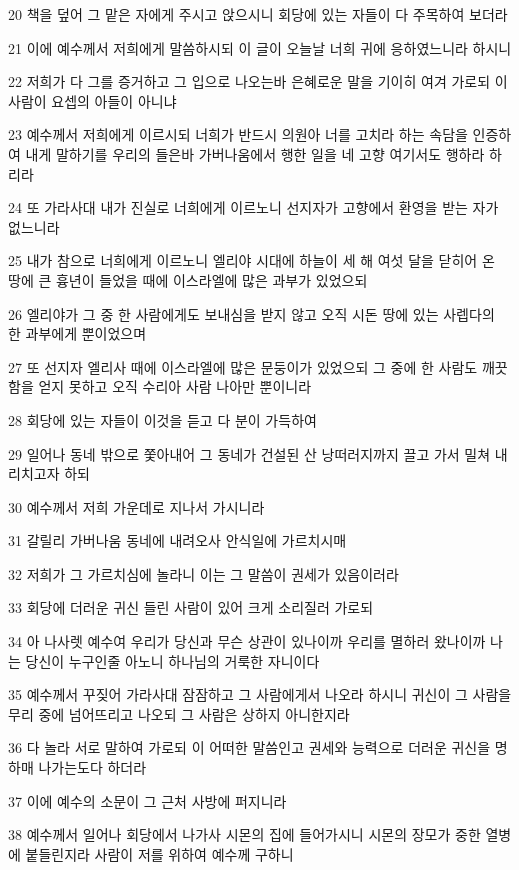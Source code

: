 \par 20 책을 덮어 그 맡은 자에게 주시고 앉으시니 회당에 있는 자들이 다 주목하여 보더라
\par 21 이에 예수께서 저희에게 말씀하시되 이 글이 오늘날 너희 귀에 응하였느니라 하시니
\par 22 저희가 다 그를 증거하고 그 입으로 나오는바 은혜로운 말을 기이히 여겨 가로되 이 사람이 요셉의 아들이 아니냐
\par 23 예수께서 저희에게 이르시되 너희가 반드시 의원아 너를 고치라 하는 속담을 인증하여 내게 말하기를 우리의 들은바 가버나움에서 행한 일을 네 고향 여기서도 행하라 하리라
\par 24 또 가라사대 내가 진실로 너희에게 이르노니 선지자가 고향에서 환영을 받는 자가 없느니라
\par 25 내가 참으로 너희에게 이르노니 엘리야 시대에 하늘이 세 해 여섯 달을 닫히어 온 땅에 큰 흉년이 들었을 때에 이스라엘에 많은 과부가 있었으되
\par 26 엘리야가 그 중 한 사람에게도 보내심을 받지 않고 오직 시돈 땅에 있는 사렙다의 한 과부에게 뿐이었으며
\par 27 또 선지자 엘리사 때에 이스라엘에 많은 문둥이가 있었으되 그 중에 한 사람도 깨끗함을 얻지 못하고 오직 수리아 사람 나아만 뿐이니라
\par 28 회당에 있는 자들이 이것을 듣고 다 분이 가득하여
\par 29 일어나 동네 밖으로 쫓아내어 그 동네가 건설된 산 낭떠러지까지 끌고 가서 밀쳐 내리치고자 하되
\par 30 예수께서 저희 가운데로 지나서 가시니라
\par 31 갈릴리 가버나움 동네에 내려오사 안식일에 가르치시매
\par 32 저희가 그 가르치심에 놀라니 이는 그 말씀이 권세가 있음이러라
\par 33 회당에 더러운 귀신 들린 사람이 있어 크게 소리질러 가로되
\par 34 아 나사렛 예수여 우리가 당신과 무슨 상관이 있나이까 우리를 멸하러 왔나이까 나는 당신이 누구인줄 아노니 하나님의 거룩한 자니이다
\par 35 예수께서 꾸짖어 가라사대 잠잠하고 그 사람에게서 나오라 하시니 귀신이 그 사람을 무리 중에 넘어뜨리고 나오되 그 사람은 상하지 아니한지라
\par 36 다 놀라 서로 말하여 가로되 이 어떠한 말씀인고 권세와 능력으로 더러운 귀신을 명하매 나가는도다 하더라
\par 37 이에 예수의 소문이 그 근처 사방에 퍼지니라
\par 38 예수께서 일어나 회당에서 나가사 시몬의 집에 들어가시니 시몬의 장모가 중한 열병에 붙들린지라 사람이 저를 위하여 예수께 구하니
